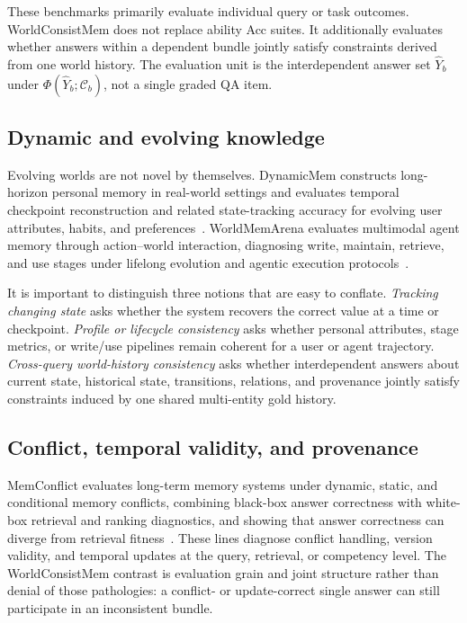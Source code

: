 These benchmarks primarily evaluate individual query or task outcomes. WorldConsistMem does not replace ability Acc suites. It additionally evaluates whether answers within a dependent bundle jointly satisfy constraints derived from one world history. The evaluation unit is the interdependent answer set $\hat Y_b$ under $\Phi(\hat Y_b;\mathcal{C}_b)$, not a single graded QA item.

\subsection{Dynamic and evolving knowledge}

Evolving worlds are not novel by themselves. DynamicMem constructs long-horizon personal memory in real-world settings and evaluates temporal checkpoint reconstruction and related state-tracking accuracy for evolving user attributes, habits, and preferences~\citep{xie2026dynamicMem}. WorldMemArena evaluates multimodal agent memory through action--world interaction, diagnosing write, maintain, retrieve, and use stages under lifelong evolution and agentic execution protocols~\citep{liu2026worldMemArena}.

It is important to distinguish three notions that are easy to conflate. \emph{Tracking changing state} asks whether the system recovers the correct value at a time or checkpoint. \emph{Profile or lifecycle consistency} asks whether personal attributes, stage metrics, or write/use pipelines remain coherent for a user or agent trajectory. \emph{Cross-query world-history consistency} asks whether interdependent answers about current state, historical state, transitions, relations, and provenance jointly satisfy constraints induced by one shared multi-entity gold history.

\subsection{Conflict, temporal validity, and provenance}

MemConflict evaluates long-term memory systems under dynamic, static, and conditional memory conflicts, combining black-box answer correctness with white-box retrieval and ranking diagnostics, and showing that answer correctness can diverge from retrieval fitness~\citep{tao2026memConflict}. These lines diagnose conflict handling, version validity, and temporal updates at the query, retrieval, or competency level. The WorldConsistMem contrast is evaluation grain and joint structure rather than denial of those pathologies: a conflict- or update-correct single answer can still participate in an inconsistent bundle.


